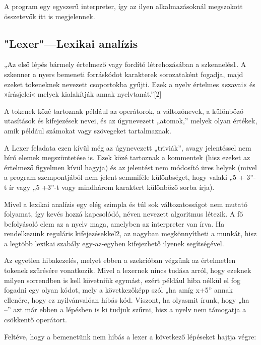 A program egy egyszerű interpreter, így az ilyen alkalmazásoknál megszokott összetevők itt is megjelennek.

\subsection{"Lexer"—Lexikai analízis}

„Az első lépés bármely értelmező vagy fordító létrehozásában a szkennelés1. A szkenner a nyers bemeneti forráskódot karakterek sorozataként fogadja, majd ezeket tokeneknek nevezett csoportokba gyűjti. Ezek a nyelv értelmes »szavai« és »írásjelei« melyek kialakítják annak nyelvtanát.”[2]

A tokenek közé tartoznak például az operátorok, a változónevek, a különböző utasítások és kifejezések nevei, és az úgynevezett „atomok,” melyek olyan értékek, amik például számokat vagy szövegeket tartalmaznak.

A Lexer feladata ezen kívül még az úgynevezett „triviák”, avagy jelentéssel nem bíró elemek megszüntetése is. Ezek közé tartoznak a kommentek (hisz ezeket az értelmező figyelmen kívül hagyja) és az jelentést nem módosító üres helyek (mivel a program szempontjából nem jelent semmiféle különbséget, hogy valaki „5 + 3”-t ír vagy „5          +3”-t vagy mindhárom karaktert különböző sorba írja).

Mivel a lexikai analízis egy elég szimpla és túl sok változatosságot nem mutató folyamat, így kevés hozzá kapcsolódó, néven nevezett algoritmus létezik. A fő befolyásoló elem az a nyelv maga, amelyben az interpreter van írva. Ha rendelkezünk reguláris kifejezésekkel2, az nagyban megkönnyítheti a munkát, hisz a legtöbb lexikai szabály egy-az-egyben kifejezhető ilyenek segítségével.

Az egyetlen hibakezelés, melyet ebben a szekcióban végzünk az értelmetlen tokenek szűrésére vonatkozik. Mivel a lexernek nincs tudása arról, hogy ezeknek milyen sorrendben is kell követniük egymást, ezért például hiba nélkül el fog fogadni egy olyan kódot, mely a következőképp szól „ha amíg x+5” annak ellenére, hogy ez nyilvánvalóan hibás kód. Viszont, ha olyasmit írunk, hogy „ha --” azt már ebben a lépésben is ki tudjuk szűrni, hisz a nyelv nem támogatja a csökkentő operátort.

Feltéve, hogy a bemenetünk nem hibás a lexer a következő lépéseket hajtja végre:

